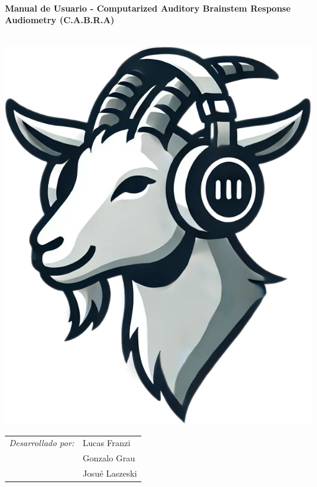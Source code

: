 \begin{center}

\vspace{1cm}


\HRule \\[0.2cm]
{ \huge \bfseries Manual de Usuario - Computarized Auditory Brainstem Response Audiometry (C.A.B.R.A) \\[0.2cm] }
\HRule \\[1cm]

\vspace{1cm}

\includegraphics[width=0.4\linewidth]{figuras/cabra_logo}


\vspace{1cm}
\begin{multicols}{2}

\columnbreak

\begin{tabular}{l l}
  \emph{Desarrollado por:}   &  Lucas Franzi \\
                    &  Gonzalo Grau \\
                    &  Josué Laszeski \\
\end{tabular}

\end{multicols}
\vspace{1cm}

\end{center}


\thispagestyle{empty}
\pagestyle{fancy}
\headheight=60pt 	%

\newpage